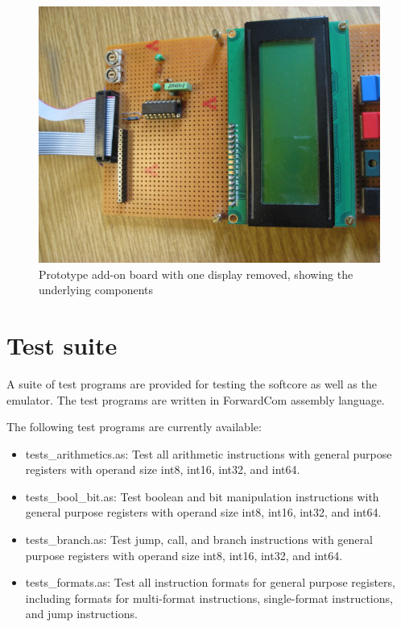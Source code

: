 \documentclass[11pt,a4paper,oneside,openright]{report}
\newcommand{\vv}{ \vspace{2mm} }   %
\begin{document}
\begin{center}
\begin{figure}[ht]
\includegraphics[width=\textwidth]{LCDboardApart.jpg}
\caption{Prototype add-on board with one display removed, showing the underlying components}
\label{fig:AddOnBoardDisassembled}
\end{figure}
\end{center}
\vv


\chapter{Test suite}
A suite of test programs are provided for testing the softcore as well as the emulator. The test programs are written in ForwardCom assembly language.
\vv

The following test programs are currently available:
\begin{itemize}
\item tests\_arithmetics.as: Test all arithmetic instructions with general purpose registers with operand size int8, int16, int32, and int64.
\item tests\_bool\_bit.as: Test boolean and bit manipulation instructions with general purpose registers with operand size int8, int16, int32, and int64.
\item tests\_branch.as: Test jump, call, and branch instructions with general purpose registers with operand size int8, int16, int32, and int64.
\item tests\_formats.as: Test all instruction formats for general purpose registers, including formats for multi-format instructions, single-format instructions, and jump instructions.
\end{itemize}
\vv
\end{document}

